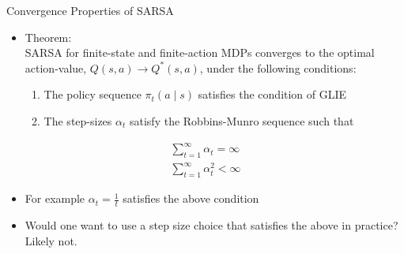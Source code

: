 \documentclass[aspectratio=169]{../latex_main/tntbeamer}  %
\begin{document}
\begin{frame}[c]{Convergence Properties of SARSA}
	
	\begin{itemize}
		\item Theorem:\\
		SARSA for finite-state and finite-action MDPs converges to the optimal
		action-value, $Q(s, a) \to  Q^*(s, a)$, under the following conditions:
		\begin{enumerate}
			\item The policy sequence $\pi_t(a \mid s)$ satisfies the condition of GLIE
			\item The step-sizes $\alpha_t$ satisfy the \alert{Robbins-Munro sequence} such that
		\end{enumerate}
	\end{itemize}
	\begin{eqnarray}
	\sum_{t=1}^{\infty} \alpha_t = \infty \nonumber \\
	\sum_{t=1}^{\infty} \alpha^2_t < \infty \nonumber
	\end{eqnarray}
	
	\begin{itemize}
		\item For example $\alpha_t= \frac{1}{t}$ satisfies the above condition
		\pause
		\item Would one want to use a step size choice that satisfies the above in
		practice? Likely not.
	\end{itemize}
	
\end{frame}
\end{document}
